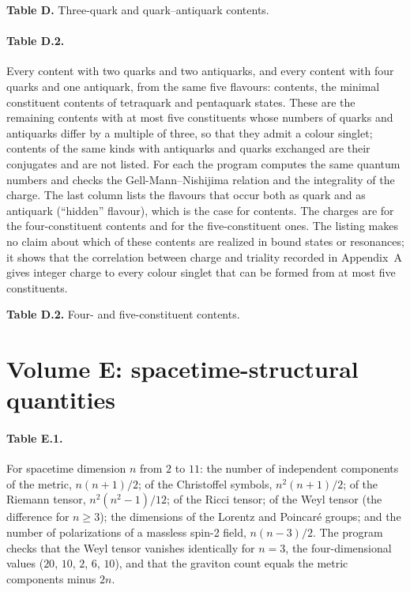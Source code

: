 \begin{center}\textbf{Table D.} Three-quark and quark--antiquark contents.\end{center}


\paragraph{Table D.2.} Every content with two quarks and two antiquarks, and every content with four quarks and one antiquark, from the same five flavours: \vvNDtwo{} contents, the minimal constituent contents of tetraquark and pentaquark states. These are the remaining contents with at most five constituents whose numbers of quarks and antiquarks differ by a multiple of three, so that they admit a colour singlet; contents of the same kinds with antiquarks and quarks exchanged are their conjugates and are not listed. For each the program computes the same quantum numbers and checks the Gell-Mann--Nishijima relation and the integrality of the charge. The last column lists the flavours that occur both as quark and as antiquark (\enquote{hidden} flavour), which is the case for \vvNDtwoHidden{} contents. The charges are \vvNDtwoQtetra{} for the four-constituent contents and \vvNDtwoQpenta{} for the five-constituent ones. The listing makes no claim about which of these contents are realized in bound states or resonances; it shows that the correlation between charge and triality recorded in Appendix~A gives integer charge to every colour singlet that can be formed from at most five constituents.

\begin{center}\textbf{Table D.2.} Four- and five-constituent contents.\end{center}


\section{Volume E: spacetime-structural quantities}\label{app:e}

\paragraph{Table E.1.} For spacetime dimension $n$ from $2$ to $11$: the number of independent components of the metric, $n(n+1)/2$; of the Christoffel symbols, $n^2(n+1)/2$; of the Riemann tensor, $n^2(n^2-1)/12$; of the Ricci tensor; of the Weyl tensor (the difference for $n \geq 3$); the dimensions of the Lorentz and Poincar\'e groups; and the number of polarizations of a massless spin-2 field, $n(n-3)/2$. The program checks that the Weyl tensor vanishes identically for $n = 3$, the four-dimensional values ($20$, $10$, $2$, $6$, $10$), and that the graviton count equals the metric components minus $2n$.

